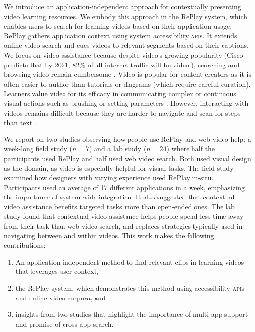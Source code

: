 We introduce an application-independent approach for contextually presenting video learning resources. We embody this approach in the RePlay system, which enables users to search for learning videos based on their application usage. RePlay gathers application context using system accessibility \textsc{api}s. It extends online video search and cues videos to relevant segments based on their captions. We focus on video assistance because despite video's growing popularity (Cisco predicts that by 2021, 82\% of all internet traffic will be video \cite{Cisco}), searching and browsing video remain cumbersome \cite{Kim2014, Pavel2014, Pavel2015}. Video is popular for content creators as it is often easier to author than tutorials or diagrams (which require careful curation). Learners value video for its efficacy in communicating complex or continuous visual actions such as brushing or setting parameters \cite{Chi2012}. However, interacting with videos remains difficult because they are harder to navigate and scan for steps than text \cite{Chi2012}.


We report on two studies observing how people use RePlay and web video help: a week-long field study ($n\!=\!7$) and a lab study ($n\!=\!24$) where half the participants used RePlay and half used web video search. Both used visual design as the domain, as video is especially helpful for visual tasks. The field study examined how designers with varying experience used RePlay in-situ. Participants used an average of 17 different applications in a week, emphasizing the importance of system-wide integration. It also suggested that contextual video assistance benefits targeted tasks more than open-ended ones. The lab study found that contextual video assistance helps people spend less time away from their task than web video search, and replaces strategies typically used in navigating between and within videos. This work makes the following contributions:

\begin{enumerate}
    \item An application-independent method to find relevant clips in learning videos that leverages user context,
    \item the RePlay system, which demonstrates this method using accessibility \textsc{api}s and online video corpora, and
    \item insights from two studies that highlight the importance of multi-app support and promise of cross-app search.
\end{enumerate}




